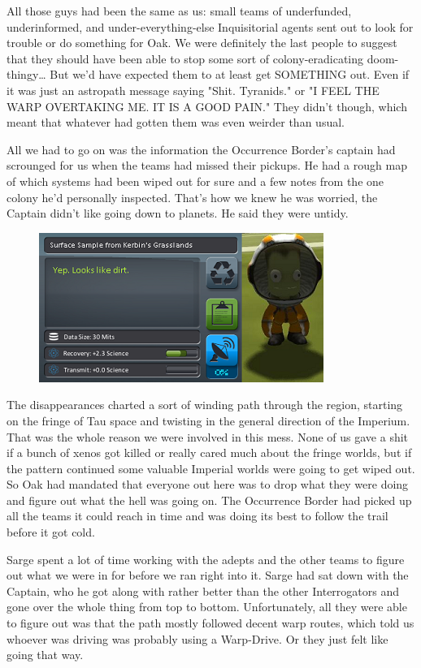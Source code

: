 All those guys had been the same as us: 
small teams of underfunded, underinformed, and under-everything-else Inquisitorial agents sent out to look for trouble or do something for Oak. 
We were definitely the last people to suggest that they should have been able to stop some sort of colony-eradicating doom-thingy… But we'd have expected them to at least get SOMETHING out. 
Even if it was just an astropath message saying "Shit. 
Tyranids." or "I FEEL THE WARP OVERTAKING ME. 
IT IS A GOOD PAIN." They didn't though, which meant that whatever had gotten them was even weirder than usual.

All we had to go on was the information the Occurrence Border's captain had scrounged for us when the teams had missed their pickups. 
He had a rough map of which systems had been wiped out for sure and a few notes from the one colony he'd personally inspected. 
That's how we knew he was worried, the Captain didn't like going down to planets. 
He said they were untidy.

\begin{figure}
	\begin{center}
		\includegraphics[width=\figwidth]{pics/11/8.png}
	\end{center}
\end{figure}
The disappearances charted a sort of winding path through the region, starting on the fringe of Tau space and twisting in the general direction of the Imperium. 
That was the whole reason we were involved in this mess. 
None of us gave a shit if a bunch of xenos got killed or really cared much about the fringe worlds, but if the pattern continued some valuable Imperial worlds were going to get wiped out. 
So Oak had mandated that everyone out here was to drop what they were doing and figure out what the hell was going on. 
The Occurrence Border had picked up all the teams it could reach in time and was doing its best to follow the trail before it got cold.

Sarge spent a lot of time working with the adepts and the other teams to figure out what we were in for before we ran right into it. 
Sarge had sat down with the Captain, who he got along with rather better than the other Interrogators and gone over the whole thing from top to bottom. 
Unfortunately, all they were able to figure out was that the path mostly followed decent warp routes, which told us whoever was driving was probably using a Warp-Drive. 
Or they just felt like going that way.

